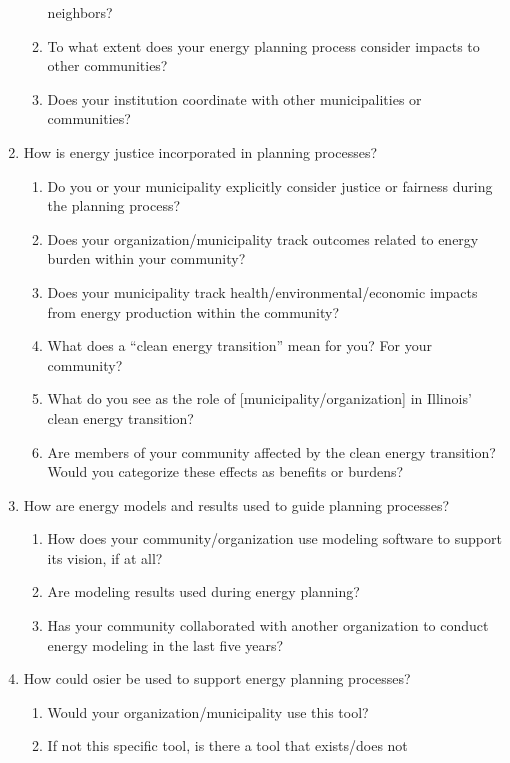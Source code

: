 \begin{enumerate}
\begin{enumerate}
        neighbors?
        \item To what extent does your energy planning process consider impacts
        to other communities?
        \item Does your institution coordinate with other municipalities or
        communities?
    \end{enumerate}
    \item How is energy justice incorporated in planning processes?
    \begin{enumerate}
        \item Do you or your municipality explicitly consider justice or
        fairness during the planning process?
        \item Does your organization/municipality track outcomes related to
        energy burden within your community?
        \item Does your municipality track health/environmental/economic impacts
        from energy production within the community?
        \item What does a ``clean energy transition'' mean for you? For your
        community?
        \item What do you see as the role of [municipality/organization] in
        Illinois' clean energy transition?
        \item Are members of your community affected by the clean energy
        transition? Would you categorize these effects as benefits or burdens?
    \end{enumerate}
    \item How are energy models and results used to guide planning processes?
    \begin{enumerate}
        \item How does your community/organization use modeling software to
        support its vision, if at all?
        \item Are modeling results used during energy planning?
        \item Has your community collaborated with another organization to
        conduct energy modeling in the last five years?
    \end{enumerate}
    \item How could \ac{osier} be used to support energy planning processes?
    \begin{enumerate}
        \item Would your organization/municipality use this tool?
        \item If not this specific tool, is there a tool that exists/does not

\end{enumerate}
\end{enumerate}
